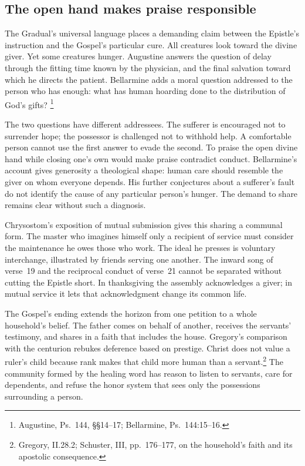 \subsection{The open hand makes praise responsible}
The Gradual's universal language places a demanding claim between the
Epistle's instruction and the Gospel's particular cure. All creatures
look toward the divine giver. Yet some creatures hunger. Augustine
answers the question of delay through the fitting time known by the
physician, and the final salvation toward which he directs the patient.
Bellarmine adds a moral question addressed to the person who has enough:
what has human hoarding done to the distribution of God's gifts?
\footnote{Augustine, Ps.~144, \S\S14--17; Bellarmine, Ps.~144:15--16.}

The two questions have different addressees. The sufferer is encouraged
not to surrender hope; the possessor is challenged not to withhold help.
A comfortable person cannot use the first answer to evade the second.
To praise the open divine hand while closing one's own would make praise
contradict conduct. Bellarmine's account gives generosity a theological
shape: human care should resemble the giver on whom everyone depends.
His further conjectures about a sufferer's fault do not identify the
cause of any particular person's hunger. The demand to share remains
clear without such a diagnosis.

Chrysostom's exposition of mutual submission gives this sharing a
communal form. The master who imagines himself only a recipient of
service must consider the maintenance he owes those who work. The
ideal he presses is voluntary interchange, illustrated by friends
serving one another. The inward song of verse~19 and the reciprocal
conduct of verse~21 cannot be separated without cutting the Epistle
short. In thanksgiving the assembly acknowledges a giver; in mutual
service it lets that acknowledgment change its common life.

The Gospel's ending extends the horizon from one petition to a whole
household's belief. The father comes on behalf of another, receives
the servants' testimony, and shares in a faith that includes the house.
Gregory's comparison with the centurion rebukes deference based on
prestige. Christ does not value a ruler's child because rank makes that
child more human than a servant.\footnote{Gregory, II.28.2; Schuster,
III, pp.~176--177, on the household's faith and its apostolic consequence.}
The community formed by the healing word has reason to listen to
servants, care for dependents, and refuse the honor system that sees
only the possessions surrounding a person.


